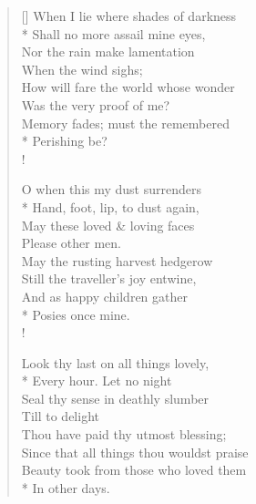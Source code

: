 \documentclass[MAIN]{subfiles}
\begin{document}
\settowidth{\versewidth}{When I lie where shades of darkness}
\begin{verse}[\versewidth]
When I lie where shades of darkness\\*
Shall no more assail mine eyes,\\
Nor the rain make lamentation\\
\vin When the wind sighs;\\
How will fare the world whose wonder\\
Was the very proof of me?\\
Memory fades; must the remembered\\*
\vin Perishing be?\\!

O when this my dust surrenders\\*
Hand, foot, lip, to dust again,\\
May these loved \& loving faces\\
\vin Please other men.\\
May the rusting harvest hedgerow\\
Still the traveller's joy entwine,\\
And as happy children gather\\*
\vin Posies once mine.\\!

Look thy last on all things lovely,\\*
Every hour. Let no night\\
Seal thy sense in deathly slumber\\
\vin Till to delight\\
Thou have paid thy utmost blessing;\\
Since that all things thou wouldst praise\\
Beauty took from those who loved them\\*
\vin In other days.
\end{verse}
\end{document}
